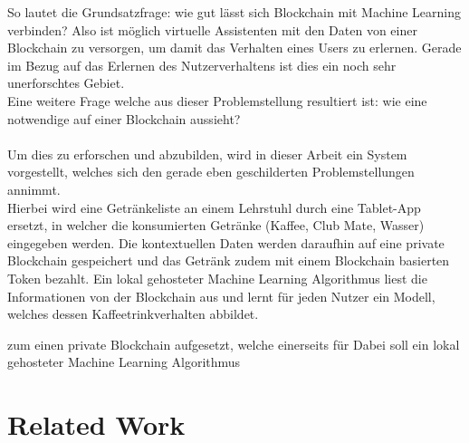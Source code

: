 So lautet die Grundsatzfrage: wie gut lässt sich Blockchain mit Machine Learning verbinden? Also ist möglich virtuelle Assistenten mit den Daten von einer Blockchain zu versorgen, um damit das Verhalten eines Users zu erlernen. 
Gerade im Bezug auf das Erlernen des Nutzerverhaltens ist dies ein noch sehr unerforschtes Gebiet. \\
Eine weitere Frage welche aus dieser Problemstellung resultiert ist: wie eine notwendige  auf einer Blockchain aussieht?\\\\
Um dies zu erforschen und abzubilden, wird in dieser Arbeit ein System vorgestellt, welches sich den gerade eben geschilderten Problemstellungen annimmt. \\
Hierbei wird eine Getränkeliste an einem Lehrstuhl durch eine Tablet-App ersetzt, in welcher die konsumierten Getränke (Kaffee, Club Mate, Wasser) eingegeben werden. 
Die kontextuellen Daten werden daraufhin auf eine private Blockchain gespeichert und das Getränk zudem mit einem Blockchain basierten Token bezahlt. 
Ein lokal gehosteter Machine Learning Algorithmus liest die Informationen von der Blockchain aus und lernt für jeden Nutzer ein Modell, welches dessen Kaffeetrinkverhalten abbildet. 


 zum einen private Blockchain aufgesetzt, welche einerseits für 
Dabei soll ein lokal gehosteter Machine Learning Algorithmus 


\section{Related Work}
%

%

